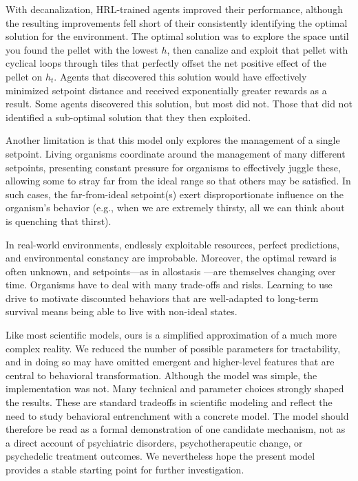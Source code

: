 \documentclass[12pt,fleqn]{article}
\begin{document}
With decanalization, HRL-trained agents improved their performance, although the resulting improvements fell short of their consistently identifying the optimal solution for the environment. The optimal solution was to explore the space until you found the pellet with the lowest \(h\), then canalize and exploit that pellet with cyclical loops through tiles that perfectly offset the net positive effect of the pellet on \(h_t\). Agents that discovered this solution would have effectively minimized setpoint distance and received exponentially greater rewards as a result. Some agents discovered this solution, but most did not. Those that did not identified a sub-optimal solution that they then exploited.

Another limitation is that this model only explores the management of a single setpoint. Living organisms coordinate around the management of many different setpoints, presenting constant pressure for organisms to effectively juggle these, allowing some to stray far from the ideal range so that others may be satisfied. In such cases, the far-from-ideal setpoint(s) exert disproportionate influence on the organism's behavior (e.g., when we are extremely thirsty, all we can think about is quenching that thirst).

In real-world environments, endlessly exploitable resources, perfect predictions, and environmental constancy are improbable. Moreover, the optimal reward is often unknown, and setpoints—as in allostasis \cite{sterling_allostasis_1988}—are themselves changing over time. Organisms have to deal with many trade-offs and risks. Learning to use drive to motivate discounted behaviors that are well-adapted to long-term survival means being able to live with non-ideal states.

Like most scientific models, ours is a simplified approximation of a much more complex reality. We reduced the number of possible parameters for tractability, and in doing so may have omitted emergent and higher-level features that are central to behavioral transformation. Although the model was simple, the implementation was not. Many technical and parameter choices strongly shaped the results. These are standard tradeoffs in scientific modeling and reflect the need to study behavioral entrenchment with a concrete model. The model should therefore be read as a formal demonstration of one candidate mechanism, not as a direct account of psychiatric disorders, psychotherapeutic change, or psychedelic treatment outcomes. We nevertheless hope the present model provides a stable starting point for further investigation.
\end{document}
